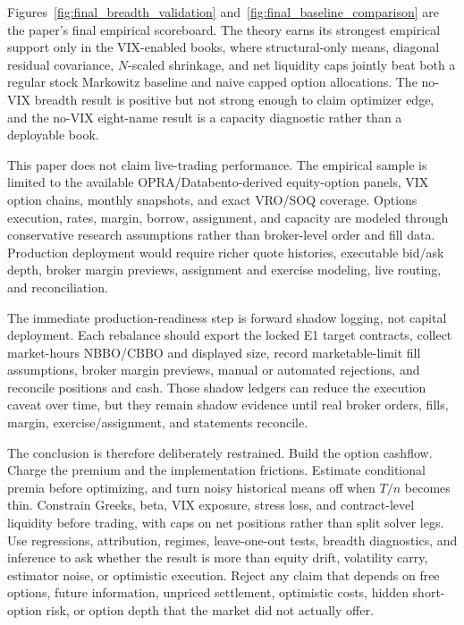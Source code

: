 Figures~\ref{fig:final_breadth_validation} and~\ref{fig:final_baseline_comparison} are the
paper's final empirical scoreboard. The theory earns its strongest empirical support only
in the VIX-enabled books, where structural-only means, diagonal residual covariance,
\(N\)-scaled shrinkage, and net liquidity caps jointly beat both a regular stock
Markowitz baseline and naive capped option allocations. The no-VIX breadth result is
positive but not strong enough to claim optimizer edge, and the no-VIX eight-name result
is a capacity diagnostic rather than a deployable book.

This paper does not claim live-trading performance. The empirical sample is limited to the
available OPRA/Databento-derived equity-option panels, VIX option chains, monthly
snapshots, and exact VRO/SOQ coverage. Options execution, rates, margin, borrow,
assignment, and capacity are modeled through conservative research assumptions rather than
broker-level order and fill data. Production deployment would require richer quote
histories, executable bid/ask depth, broker margin previews, assignment and exercise
modeling, live routing, and reconciliation.

The immediate production-readiness step is forward shadow logging, not capital deployment.
Each rebalance should export the locked E1 target contracts, collect market-hours NBBO/CBBO
and displayed size, record marketable-limit fill assumptions, broker margin previews,
manual or automated rejections, and reconcile positions and cash. Those shadow ledgers can
reduce the execution caveat over time, but they remain shadow evidence until real broker
orders, fills, margin, exercise/assignment, and statements reconcile.

The conclusion is therefore deliberately restrained. Build the option cashflow. Charge the
premium and the implementation frictions. Estimate conditional premia before optimizing,
and turn noisy historical means off when \(T/n\) becomes thin. Constrain Greeks, beta, VIX
exposure, stress loss, and contract-level liquidity before trading, with caps on net
positions rather than split solver legs. Use regressions, attribution, regimes,
leave-one-out tests, breadth diagnostics, and inference to ask whether the result is more
than equity drift, volatility carry, estimator noise, or optimistic execution. Reject any
claim that depends on free options, future information, unpriced settlement, optimistic
costs, hidden short-option risk, or option depth that the market did not actually offer.
